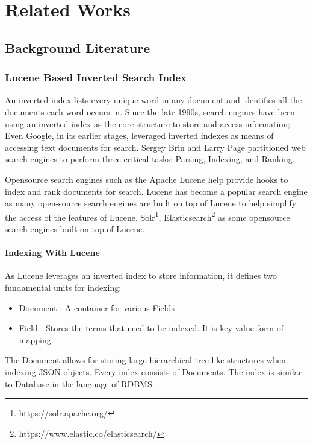 \chapter{Related Works}
\label{relatedwork}

\section{Background Literature}
\label{relatedwork:background}

\subsection{Lucene Based Inverted Search Index}
An inverted index lists every unique word in any document and identifies all the documents each word occurs in. Since the late 1990s, search engines have been using an inverted index as the core structure to store and access information; Even Google, in its earlier stages, leveraged inverted indexes as means of accessing text documents for search\parencite{brin1998anatomy}. Sergey Brin and Larry Page partitioned web search engines to perform three critical tasks: Parsing, Indexing, and Ranking.

Opensource search engines such as the Apache Lucene\parencite{lucene2010apache} help provide hooks to index and rank documents for search. Lucene has become a popular search engine as many open-source search engines are built on top of Lucene to help simplify the access of the features of Lucene. Solr\footnote{https://solr.apache.org/}, Elasticsearch\footnote{https://www.elastic.co/elasticsearch/} as some opensource search engines built on top of Lucene. 

\subsubsection{Indexing With Lucene}
As Lucene leverages an inverted index to store information, it defines two fundamental units for indexing:
\begin{itemize}
    \item Document : A container for various Fields
    \item Field : Stores the terms that need to be indexed. It is key-value form of mapping. 
\end{itemize}
The Document allows for storing large hierarchical tree-like structures when indexing JSON objects. Every index consists of Documents. The index is similar to Database in the language of RDBMS. 

